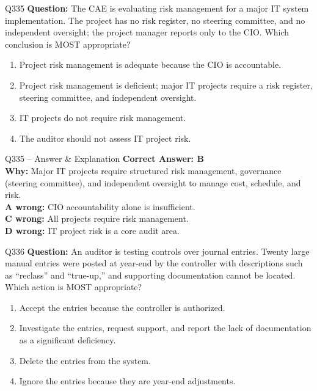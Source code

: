 \documentclass[aspectratio=169,10pt]{beamer}
\begin{document}
	\begin{frame}[t]{Q335}
		\small
		\textbf{Question:} The CAE is evaluating risk management for a major IT system implementation. The project has no risk register, no steering committee, and no independent oversight; the project manager reports only to the CIO. Which conclusion is MOST appropriate?
		\begin{enumerate}[label=\Alph*.,itemsep=1pt,topsep=2pt]
			\item Project risk management is adequate because the CIO is accountable.
			\item Project risk management is deficient; major IT projects require a risk register, steering committee, and independent oversight.
			\item IT projects do not require risk management.
			\item The auditor should not assess IT project risk.
		\end{enumerate}
	\end{frame}
	
	\begin{frame}[t]{Q335 -- Answer \& Explanation}
		\small
		\textbf{Correct Answer: B} \\[4pt]
		\textbf{Why:} Major IT projects require structured risk management, governance (steering committee), and independent oversight to manage cost, schedule, and risk. \\[4pt]
		\textbf{A wrong:} CIO accountability alone is insufficient. \\[2pt]
		\textbf{C wrong:} All projects require risk management. \\[2pt]
		\textbf{D wrong:} IT project risk is a core audit area.
	\end{frame}
	
	\begin{frame}[t]{Q336}
		\small
		\textbf{Question:} An auditor is testing controls over journal entries. Twenty large manual entries were posted at year-end by the controller with descriptions such as ``reclass'' and ``true-up,'' and supporting documentation cannot be located. Which action is MOST appropriate?
		\begin{enumerate}[label=\Alph*.,itemsep=1pt,topsep=2pt]
			\item Accept the entries because the controller is authorized.
			\item Investigate the entries, request support, and report the lack of documentation as a significant deficiency.
			\item Delete the entries from the system.
			\item Ignore the entries because they are year-end adjustments.
		\end{enumerate}
	\end{frame}
	
\end{document}
